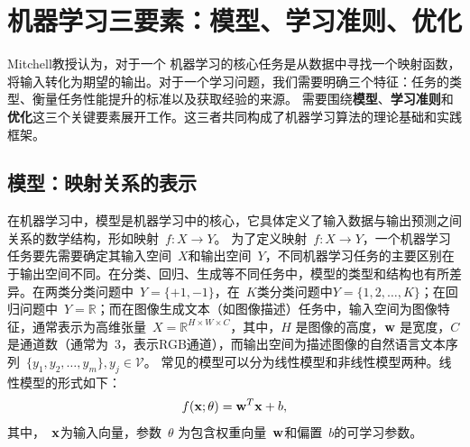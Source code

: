 \section{机器学习三要素：模型、学习准则、优化}


Mitchell教授认为，对于一个
机器学习的核心任务是从数据中寻找一个映射函数，将输入转化为期望的输出。对于一个学习问题，我们需要明确三个特征：任务的类型、衡量任务性能提升的标准以及获取经验的来源。
需要围绕{\bf 模型}、{\bf 学习准则}和{\bf 优化}这三个关键要素展开工作。这三者共同构成了机器学习算法的理论基础和实践框架。



\subsection{模型：映射关系的表示}


在机器学习中，模型是机器学习中的核心，它具体定义了输入数据与输出预测之间关系的数学结构，形如映射~$f: X \rightarrow Y$。
为了定义映射~$f: X \rightarrow Y$，一个机器学习任务要先需要确定其输入空间~$X$和输出空间~$Y$，不同机器学习任务的主要区别在于输出空间不同。在分类、回归、生成等不同任务中，模型的类型和结构也有所差异。在两类分类问题中~$Y = \{+1,-1\}$，在~$K$类分类问题中$Y =\{1, 2,\dots , K\}$；在回归问题中~$Y = \mathbb{R}$；而在图像生成文本（如图像描述）任务中，输入空间为图像特征，通常表示为高维张量~$X=\mathbb{R}^{H\times W\times C}$，其中，$H$ 是图像的高度，${\bf w}$ 是宽度，$C$ 是通道数（通常为~$3$，表示RGB通道），而输出空间为描述图像的自然语言文本序列~$\{y_1,y_2,\dots, y_m \}, y_j\in \mathcal{V}$。
常见的模型可以分为线性模型和非线性模型两种。线性模型的形式如下：
$$
f({\bf x}; \theta)= {\bf w}^T{\bf x} +b,
$$
其中，~${\bf x}$为输入向量，参数~$\theta$ 为包含权重向量~${\bf w}$和偏置~$b$的可学习参数。


